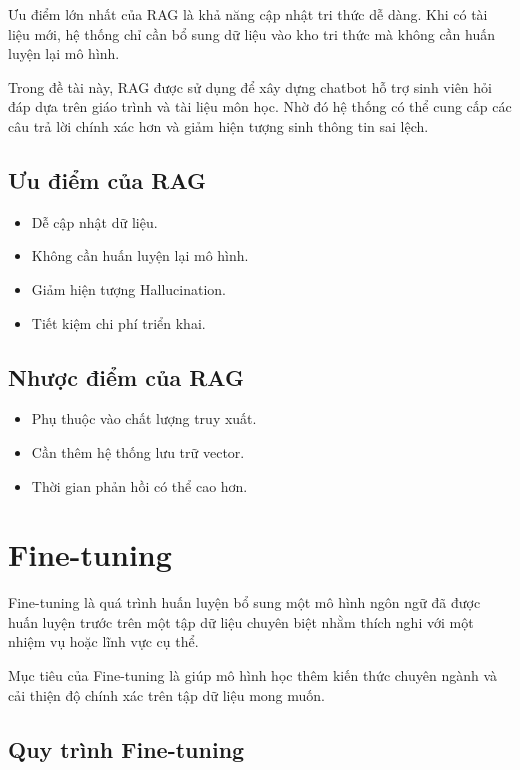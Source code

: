 \documentclass[12pt,a4paper]{report}
\begin{document}
	Ưu điểm lớn nhất của RAG là khả năng cập nhật tri thức dễ dàng. Khi có tài liệu mới, hệ thống chỉ cần bổ sung dữ liệu vào kho tri thức mà không cần huấn luyện lại mô hình.
	
	Trong đề tài này, RAG được sử dụng để xây dựng chatbot hỗ trợ sinh viên hỏi đáp dựa trên giáo trình và tài liệu môn học. Nhờ đó hệ thống có thể cung cấp các câu trả lời chính xác hơn và giảm hiện tượng sinh thông tin sai lệch.
	
	\subsection{Ưu điểm của RAG}
	
	\begin{itemize}
		\item Dễ cập nhật dữ liệu.
		\item Không cần huấn luyện lại mô hình.
		\item Giảm hiện tượng Hallucination.
		\item Tiết kiệm chi phí triển khai.
	\end{itemize}
	
	\subsection{Nhược điểm của RAG}
	
	\begin{itemize}
		\item Phụ thuộc vào chất lượng truy xuất.
		\item Cần thêm hệ thống lưu trữ vector.
		\item Thời gian phản hồi có thể cao hơn.
	\end{itemize}
	
	\section{Fine-tuning}
	
	Fine-tuning là quá trình huấn luyện bổ sung một mô hình ngôn ngữ đã được huấn luyện trước trên một tập dữ liệu chuyên biệt nhằm thích nghi với một nhiệm vụ hoặc lĩnh vực cụ thể.
	
	Mục tiêu của Fine-tuning là giúp mô hình học thêm kiến thức chuyên ngành và cải thiện độ chính xác trên tập dữ liệu mong muốn.
	
	\subsection{Quy trình Fine-tuning}
	
\end{document}

